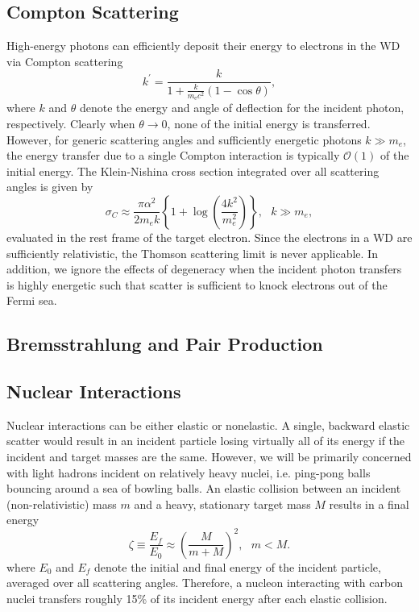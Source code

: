 \documentclass[twocolumn,showpacs,preprintnumbers,amsmath,amssymb,prd]{revtex4}
\newcommand{\OO}{\mathcal{O}}
\def\r{\right)}
\def\l{\left(}
\begin{document}
\begin{appendices}
\subsection*{Compton Scattering}
High-energy photons can efficiently deposit their energy to electrons in the WD via Compton scattering
\begin{equation}
{k^{\prime }={\frac {k}{1+{\frac {k}{m_{\text{e}}c^{2}}}(1-\cos \theta )}}},
\end{equation}
where $k$ and $\theta$ denote the energy and angle of deflection for the incident photon, respectively. Clearly when $\theta \to 0$, none of the initial energy is transferred. However, for generic scattering angles and sufficiently energetic photons $k \gg m_e$, the energy transfer due to a single Compton interaction is typically $\OO(1)$ of the initial energy.
The Klein-Nishina cross section integrated over all scattering angles is given by
\begin{equation}
\sigma_C \approx \frac{\pi \alpha^2}{2 m_e k} \left \{1+\log{\l\frac{4 k^2}{m_e^2} \r}\right \}, ~~~ k \gg m_e,
\end{equation}
evaluated in the rest frame of the target electron. Since the electrons in a WD are sufficiently relativistic, the Thomson scattering limit is never applicable. In addition, we ignore the effects of degeneracy when the incident photon transfers is highly energetic such that scatter is sufficient to knock electrons out of the Fermi sea.


\subsection*{Bremsstrahlung and Pair Production}

\subsection*{Nuclear Interactions}

Nuclear interactions can be either elastic or nonelastic. A single, backward elastic scatter would result in an incident particle losing virtually all of its energy if the incident and target masses are the same. However, we will be primarily concerned with light hadrons incident on relatively heavy nuclei, i.e. ping-pong balls bouncing around a sea of bowling balls. An elastic collision between an incident (non-relativistic) mass $m$ and a heavy, stationary target mass $M$ results in a final energy
\begin{equation}
\label{eq:elasticratio}
\zeta \equiv \frac{E_f}{E_0} \approx \l \frac{M}{m+M} \r^2, ~~~ m<M.
\end{equation}
where $E_0$ and $E_f$ denote the initial and final energy of the incident particle, averaged over all scattering angles. Therefore, a nucleon interacting with carbon nuclei transfers roughly 15\% of its incident energy after each elastic collision. 


\end{appendices}
\end{document}

